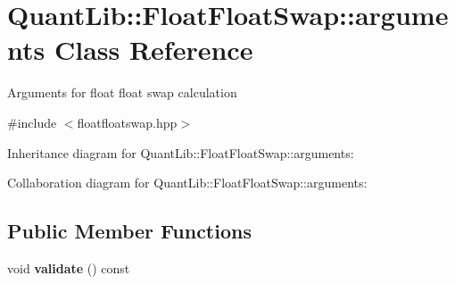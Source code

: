 \section{Quant\+Lib\+:\+:Float\+Float\+Swap\+:\+:arguments Class Reference}
\label{class_quant_lib_1_1_float_float_swap_1_1arguments}


Arguments for float float swap calculation  




{\ttfamily \#include $<$floatfloatswap.\+hpp$>$}



Inheritance diagram for Quant\+Lib\+:\+:Float\+Float\+Swap\+:\+:arguments\+:


Collaboration diagram for Quant\+Lib\+:\+:Float\+Float\+Swap\+:\+:arguments\+:
\subsection*{Public Member Functions}
\begin{DoxyCompactItemize}
\item 
void {\bfseries validate} () const \label{class_quant_lib_1_1_float_float_swap_1_1arguments_a557ceab54c70c32eb13490456d21f16e}

\end{DoxyCompactItemize}
